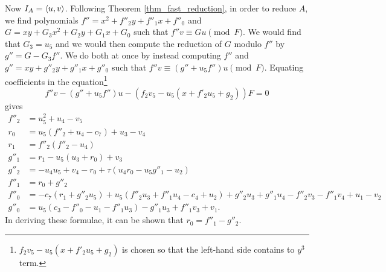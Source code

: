 Now $I_A = \left\langle u,v \right\rangle$.
Following Theorem \ref{thm_fast_reduction},
in order to reduce $A$, we find polynomials
$f'' = x^2 + f''_2y + f''_1x + f''_0$ and
$G = xy + G_3x^2 + G_2y + G_1x + G_0$ such that $f''v \equiv Gu \pmod F$.
We would find that $G_3 = u_5$ and we would then compute the reduction of $G$ modulo $f''$ by $g'' = G - G_3 f''$.
We do both at once by instead computing $f''$ and $g'' = xy + g''_2y + g''_1x + g''_0$
such that $f''v \equiv (g'' + u_5f'')u \pmod F$.
Equating coefficients in the equation\footnote{
$f_2v_5 - u_5(x + f'_2u_5 + g_2)$ is chosen so that the left-hand side contains to $y^3$ term.}
\[f''v - (g'' + u_5f'')u - (f_2v_5 - u_5(x + f'_2u_5 + g_2))F = 0 \]
gives
\begin{align*}
  f''_2 &= u_5^2 + u_4 - v_5 \\
  r_0   &= u_5(f''_2 + u_4 - c_7) + u_3 - v_4 \\
  r_1   &= f''_2(f''_2 - u_4) \\
  g''_1 &= r_1 - u_5(u_3 + r_0) + v_3 \\
  g''_2 &= -u_4u_5 + v_4 - r_0 + \tau(u_4r_0 - u_5g''_1 - u_2) \\
  f''_1 &= r_0 + g''_2 \\
  f''_0 &= -c_7(r_1 + g''_2u_5) + u_5(f''_2u_3 + f''_1u_4 - c_4 + u_2)
         + g''_2u_3 + g''_1u_4 - f''_2v_3 - f''_1v_4 + u_1 - v_2 \\
  g''_0 &= u_5(c_3 - f''_0 - u_1 - f''_1u_3) - g''_1u_3 + f''_1v_3 + v_1.
\end{align*}
In deriving these formulae, it can be shown that $r_0 = f''_1 - g''_2$.
\begin{comment}
\begin{align*}
  G_3 &= u_5 \\
  f''_2 &= u_5^2 + u_4 - v_5 \\
  G_2 &= v_4 + u_5v_5 + \tau(u_5(u_3u_5 + v_5(u_4 - c_7) - v_3) + v_5(u_3 - v_4) - u_2) \\
  e_3 &= f''_2v_5 - G_2u_5 \\
  f''_1 &= u_5(u_4 - c_7) + G_2 + u_3 - v_4 \\
  G_1 &= -u_3u_5 - e_3 + v_3 \\
  f''_0 &= c_7e_3 + u_5(u_2 - c_4) + G_2u_3 + G_1u_4 - f''_2v_3 - f''_1v_4 + u_1 - v_2 \\
  G_0 &= u_5(c_3 - u_1) - G_1u_3 + f''_1v_3 + v_1.
\end{align*}
\end{comment}
